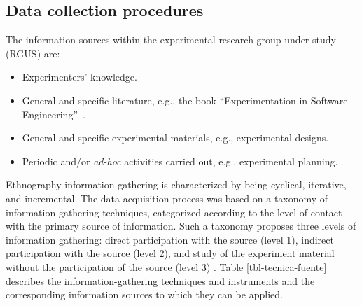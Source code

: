 \subsection{Data collection procedures}\label{subsec-data-collection}

The information sources within the experimental research group under study (RGUS) are:

\begin{itemize}

	\item Experimenters' knowledge.
	
	\item General and specific literature, e.g., the book \textquotedblleft Experimentation in Software Engineering\textquotedblright~\cite{Wohlin-2012-experimentatio-SE}.
	
	\item General and specific experimental materials, e.g., experimental designs.
	
	\item Periodic and/or \textit{ad-hoc} activities carried out, e.g., experimental planning.
	
\end{itemize}

Ethnography information gathering is characterized by being cyclical, iterative, and incremental. The data acquisition process was based on a taxonomy of information-gathering techniques, categorized according to the level of contact with the primary source of information. Such a taxonomy proposes three levels of information gathering: direct participation with the source (level 1), indirect participation with the source (level 2), and study of the experiment material without the participation of the source (level 3) \cite{Lethbridge-2005-data-collection-techniques-SE}. Table \ref{tbl-tecnica-fuente} describes the information-gathering techniques and instruments and the corresponding information sources to which they can be applied.

